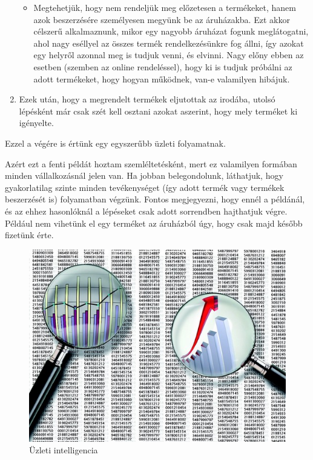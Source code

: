 \begin{enumerate}
\begin{itemize}
\item Megtehetjük, hogy nem rendeljük meg előzetesen a termékeket, hanem azok beszerzésére személyesen megyünk be az áruházakba. Ezt akkor célszerű alkalmaznunk, mikor egy nagyobb áruházat fogunk meglátogatni, ahol nagy eséllyel az összes termék rendelkezésünkre fog állni, így azokat egy helyről azonnal meg is tudjuk venni, és elvinni. Nagy előny ebben az esetben (szemben az online rendeléssel), hogy ki is tudjuk próbálni az adott termékeket, hogy hogyan működnek, van-e valamilyen hibájuk.
\end{itemize}

\item Ezek után, hogy a megrendelt termékek eljutottak az irodába, utolsó lépésként már csak szét kell osztani azokat aszerint, hogy mely terméket ki igényelte.
\end{enumerate}
Ezzel a végére is értünk egy egyszerűbb üzleti folyamatnak.

Azért ezt a fenti példát hoztam szemléltetésként, mert ez valamilyen formában minden vállalkozásnál jelen van. Ha jobban belegondolunk, láthatjuk, hogy gyakorlatilag szinte minden tevékenységet (így adott termék vagy termékek beszerzését is) folyamatban végzünk. Fontos megjegyezni, hogy ennél a példánál, és az ehhez hasonlóknál a lépéseket csak adott sorrendben hajthatjuk végre. Például nem vihetünk el egy terméket az áruházból úgy, hogy csak majd később fizetünk érte.

\begin{figure}[h]
\centering
\includegraphics[scale=0.5]{images/uzleti_intelligencia.png}
\caption{Üzleti intelligencia\cite{piacp}}
\label{fig:uzlint}
\end{figure}

